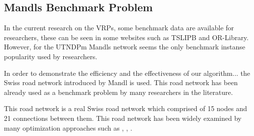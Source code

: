 \subsection{Mandls Benchmark Problem}
In the current research on the VRPs, some benchmark data are available for researchers, these can be seen in some websites such as TSLIPB and OR-Library. However, for the UTNDPm Mandls network seems the only benchmark instanse popularity used by researchers. 

In order to demonstrate the efficiency and the effectiveness of our algorithm... the Swiss road network introduced by Mandl is used. This road network has been already used as a benchmark problem by many researchers in the literature. \citep{kechagiopoulos14}

This road network is a real Swiss road network which comprised of 15 nodes and 21 connections between them. This road network has been widely examined by many optimization approaches such as \citep{kechagiopoulos14}, \citep{fan09}, \citep{nikolic14}.